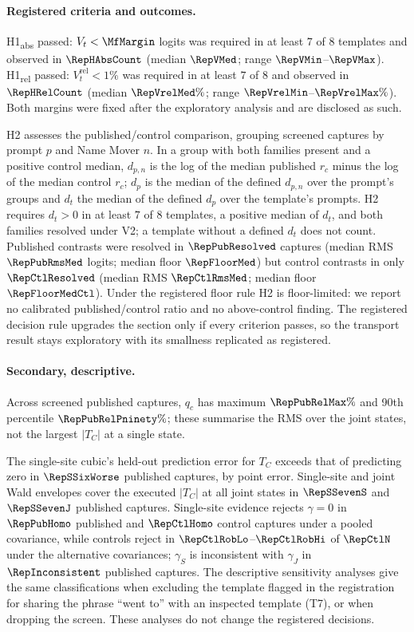 \paragraph{Registered criteria and outcomes.} H1\textsubscript{abs} passed: $V_t<\MfMargin$ logits was required in
at least $7$ of $8$ templates and observed in $\RepHAbsCount$ (median $\RepVMed$; range $\RepVMin$--$\RepVMax$).
H1\textsubscript{rel} passed: $V_t^{\mathrm{rel}}<1\%$ was required in at least $7$ of $8$ and observed in $\RepHRelCount$ (median $\RepVrelMed\%$; range $\RepVrelMin$--$\RepVrelMax\%$). Both margins were fixed after the exploratory analysis and
are disclosed as such.

H2 assesses the published/control comparison, grouping screened captures by prompt $p$ and Name Mover $n$. In a group with both families present and a positive
control median, $d_{p,n}$ is the log of the median published $r_c$ minus the log of the median control $r_c$; $d_p$ is
the median of the defined $d_{p,n}$ over the prompt's groups and $d_t$ the median of the defined $d_p$ over the
template's prompts. H2 requires $d_t>0$ in at least $7$ of $8$ templates, a positive median of $d_t$, and both
families resolved under V2; a template without a defined $d_t$ does not count. Published contrasts were resolved in $\RepPubResolved$
captures (median RMS $\RepPubRmsMed$ logits; median floor $\RepFloorMed$) but control contrasts in only $\RepCtlResolved$
(median RMS $\RepCtlRmsMed$; median floor $\RepFloorMedCtl$). Under the registered floor rule H2 is floor-limited: we
report no calibrated published/control ratio and no above-control finding. The registered decision rule upgrades the section
only if every criterion passes, so the transport result stays exploratory with its smallness replicated as
registered.

\paragraph{Secondary, descriptive.} Across screened published captures, $q_c$ has maximum $\RepPubRelMax\%$ and 90th
percentile $\RepPubRelPninety\%$; these summarise the RMS over the joint states, not the largest $|T_C|$ at a single
state.

The single-site cubic's held-out prediction error for $T_C$ exceeds that of predicting zero in
$\RepSSixWorse$ published captures, by point error. Single-site and joint Wald envelopes cover the executed $|T_C|$ at all joint states
in $\RepSSevenS$ and $\RepSSevenJ$ published captures. Single-site evidence rejects $\gamma=0$ in $\RepPubHomo$ published
and $\RepCtlHomo$ control captures under a pooled covariance, while controls reject in $\RepCtlRobLo$--$\RepCtlRobHi$ of
$\RepCtlN$ under the alternative covariances; $\gamma_S$ is inconsistent with $\gamma_J$ in $\RepInconsistent$ published
captures. The descriptive sensitivity analyses give the same classifications when excluding the template flagged in the registration
for sharing the phrase ``went to'' with an inspected template (T7), or when dropping the screen. These analyses do not
change the registered decisions.
